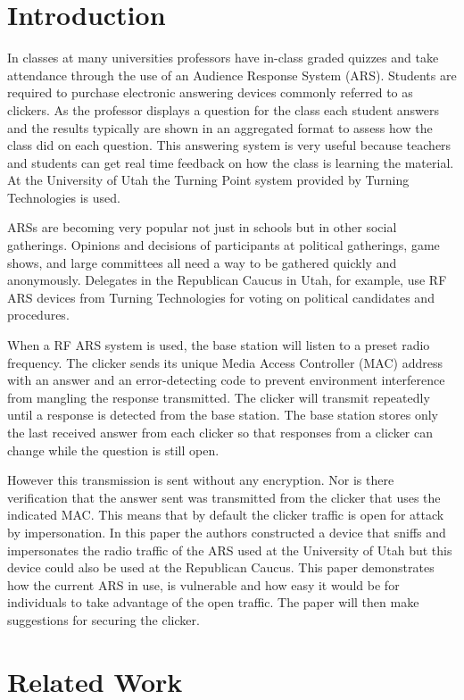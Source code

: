 
\section{Introduction}
In classes at many universities professors have in-class graded quizzes and take attendance through the use of an Audience Response System (ARS). Students are required to purchase electronic answering devices commonly referred to as clickers.  As the professor displays a question for the class each student answers and the results typically are shown in an aggregated format to assess how the class did on each question.  This answering system is very useful because teachers and students can get real time feedback on how the class is learning the material.  At the University of Utah the Turning Point system provided by Turning Technologies is used.

ARSs are becoming very popular not just in schools but in other social gatherings.  Opinions and decisions of participants at political gatherings, game shows, and large committees all need a way to be gathered quickly and anonymously.  Delegates in the Republican Caucus in Utah, for example, use RF ARS
devices from Turning Technologies for voting on political candidates
and procedures.

When a RF ARS system is used, the base station will listen to a preset radio frequency. The clicker sends its unique Media Access Controller (MAC) address with an answer and an error-detecting code to prevent environment interference from mangling the response transmitted.  The clicker will transmit repeatedly until a response is detected from the base station.  The base station stores only the last received answer from each clicker so that responses from a clicker can change while the question is still open.

However this transmission is sent without any encryption.  Nor is there verification that the answer sent was transmitted from the clicker that uses the indicated MAC.  This means that by default the clicker traffic is open for attack by impersonation.  In this paper the authors constructed a device that sniffs and impersonates the radio traffic of the ARS used at the University of Utah but this device could also be used at the Republican Caucus.  This paper demonstrates how the current ARS in use, is vulnerable and how easy it would be for individuals to take advantage of the open traffic.  The paper will then make suggestions for securing the clicker.

\section{Related Work}

